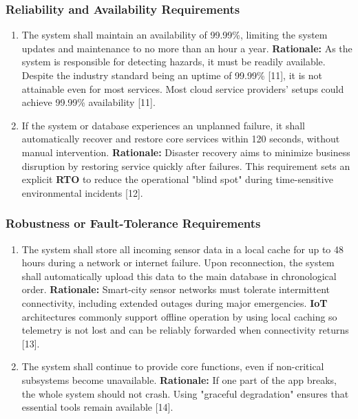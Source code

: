 \documentclass[]{article}
\begin{document}
\subsubsection{Reliability and Availability Requirements}
\label{ssub:reliability_and_availability_requirements}
\begin{enumerate}[{PR-RA}1. ]
	\item The system shall maintain an availability of 99.99\%, limiting the system updates and maintenance to no more than an hour a year.\newline
	{\bf Rationale:} As the system is responsible for detecting hazards, it must be readily available. Despite the industry standard being an uptime of 99.99\% [11], it is not attainable even for most services. Most cloud service providers' setups could achieve 99.99\% availability [11].
	\item If the system or database experiences an unplanned failure, it shall automatically recover and restore core services within 120 seconds, without manual intervention.\newline
	{\bf Rationale:} Disaster recovery aims to minimize business disruption by restoring service quickly after failures. This requirement sets an explicit \textbf{RTO} to reduce the operational "blind spot" during time-sensitive environmental incidents [12].
\end{enumerate}

\subsubsection{Robustness or Fault-Tolerance Requirements}
\label{ssub:robustness_or_fault_tolerance_requirements}
\begin{enumerate}[{PR-RFT}1. ]
	\item The system shall store all incoming sensor data in a local cache for up to 48 hours during a network or internet failure. Upon reconnection, the system shall automatically upload this data to the main database in chronological order.\newline
	{\bf Rationale:} Smart-city sensor networks must tolerate intermittent connectivity, including extended outages during major emergencies. \textbf{IoT} architectures commonly support offline operation by using local caching so telemetry is not lost and can be reliably forwarded when connectivity returns [13].
	\item The system shall continue to provide core functions, even if non-critical subsystems become unavailable.\newline
	{\bf Rationale:} If one part of the app breaks, the whole system should not crash. Using "graceful degradation" ensures that essential tools remain available [14].
\end{enumerate}
\end{document}
